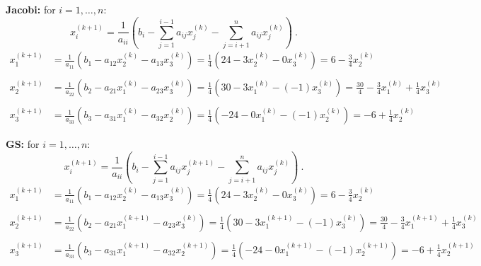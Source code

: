 \documentclass[12pt]{article}
\begin{document}
\textbf{Jacobi:} for $i = 1, \dots, n$:
\[ x^{(k+1)}_i = \frac{1}{a_{ii}}(b_i - \sum_{j=1}^{i-1} a_{ij} x_j^{(k)} - \sum_{j=i+1}^{n} a_{ij} x_j^{(k)}) \:.\]
%
\begin{align*}
x_1^{(k+1)} &= \frac{1}{a_{11}}(b_{1} - a_{12} x_2^{(k)} - a_{13} x_3^{(k)}) = \frac{1}{4}(24 - 3 x_2^{(k)} - 0 x_3^{(k)}) = 6 - \frac{3}{4}x_2^{(k)}  \\
%
\\
x_2^{(k+1)} &= \frac{1}{a_{22}}(b_2 - a_{21} x_1^{(k)} - a_{23} x_3^{(k)}) = \frac{1}{4}(30 - 3 x_1^{(k)} - (-1) x_3^{(k)})= \frac{30}{4} - \frac{3}{4}x_1^{(k)} + \frac{1}{4}x_3^{(k)} \\
%
\\
x_3^{(k+1)} &= \frac{1}{a_{33}}(b_3 - a_{31} x_1^{(k)} - a_{32} x_2^{(k)}) = \frac{1}{4}(-24 - 0 x_1^{(k)} - (-1) x_2^{(k)}) = -6 + \frac{1}{4}x_2^{(k)}
\end{align*}

\textbf{GS:} for $i = 1, \dots, n$:
\[ x^{(k+1)}_i = \frac{1}{a_{ii}}(b_i - \sum_{j=1}^{i-1} a_{ij} x_j^{(k+1)} - \sum_{j=i+1}^{n} a_{ij} x_j^{(k)}) \:.\]
%
\begin{align*}
x_1^{(k+1)} &= \frac{1}{a_{11}}(b_{1} - a_{12} x_2^{(k)} - a_{13} x_3^{(k)}) = \frac{1}{4}(24 - 3 x_2^{(k)} - 0 x_3^{(k)}) = 6 - \frac{3}{4}x_2^{(k)}  \\
%
\\
x_2^{(k+1)} &= \frac{1}{a_{22}}(b_2 - a_{21} x_1^{(k+1)} - a_{23} x_3^{(k)}) = \frac{1}{4}(30 - 3 x_1^{(k+1)} - (-1) x_3^{(k)}) 
= \frac{30}{4} - \frac{3}{4}x_1^{(k+1)} + \frac{1}{4}x_3^{(k)}\\
%
\\
x_3^{(k+1)} &= \frac{1}{a_{33}}(b_3 - a_{31} x_1^{(k+1)} - a_{32} x_2^{(k+1)}) = \frac{1}{4}(-24 - 0 x_1^{(k+1)} - (-1) x_2^{(k+1)}) = -6 + \frac{1}{4}x_2^{(k+1)}
\end{align*}
\end{document}
